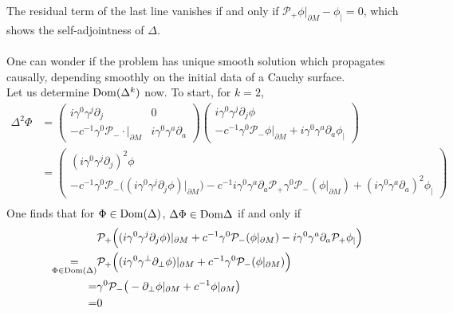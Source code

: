 The residual term of the last line vanishes if and only if $\mathcal{P}_+\phi \vert_{\partial M} - \phi_|= 0$, which shows the self-adjointness of $\Delta$. \\\\
One can wonder if the problem has unique smooth solution which propagates causally, \ie depending smoothly on the initial data of a Cauchy surface. \\
Let us determine $\mathrm{Dom} (\Delta^k)$ now. 
To start, for $k =2$, 
\begin{equation}\label{wen-deltak}
\begin{split}
\Delta^2 \Phi & =  
\begin{pmatrix} i \gamma^0 \gamma^j \partial_j & 0 \\
- c^{-1} \gamma^0 \mathcal{P}_- \cdot \vert_{\partial M} & i \gamma^0 \gamma^a \partial_a \end{pmatrix}
\begin{pmatrix}   i \gamma^0 \gamma^j \partial_j \phi \\
- c^{-1} \gamma^0 \mathcal{P}_- \phi\vert_{\partial M} + i \gamma^0 \gamma^a \partial_a  \phi_| \end{pmatrix} \\
&= 
\begin{pmatrix} (i\gamma^0\gamma^j\partial_j)^2 \phi \\
-c^{-1}\gamma^0\mathcal{P}_- \big( (i\gamma^0\gamma^j\partial_j \phi)\vert_{\partial M}\big)
-c^{-1}i \gamma^0\gamma^a\partial_a \mathcal{P}_+ \gamma^0 \mathcal{P}_-(\phi\vert_{\partial M})
+ (i\gamma^0\gamma^a\partial_a)^2\phi_| \end{pmatrix}
\\
\end{split}
\end{equation}
One finds that for $\Phi \in \mathrm{Dom}(\Delta)$, $\Delta \Phi \in \mathrm{Dom} \Delta$ if and only if
\begin{equation*}
\begin{split}
&\mathcal{P}_+\Big( ( i\gamma^0\gamma^j \partial_j \phi ) \vert_{\partial M} +
 c^{-1}\gamma^0 \mathcal{P}_- ( \phi \vert_{\partial M})
- i \gamma^0 \gamma^a \partial_a \mathcal{P}_+\phi _| \Big) \\
\underset{\Phi\in \mathrm{Dom}(\Delta)}{ = }& 
\mathcal{P}_+\Big( (i\gamma^0\gamma^\bot \partial_\bot\phi)\vert_{\partial M} +
c^{-1}\gamma^0 \mathcal{P}_- ( \phi \vert_{\partial M}) \Big) \\ 
= & 
\gamma^0\mathcal{P}_-\big(- \partial_\bot \phi \vert_{\partial M} + c^{-1} \phi\vert_{\partial M}\big)
\\ = & 0
\end{split}
\end{equation*}
